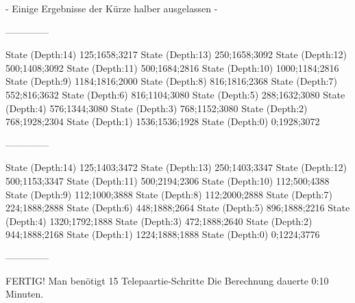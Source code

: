 \documentclass[a4paper,10pt,ngerman]{scrartcl}
\begin{document}
- Einige Ergebnisse der Kürze halber ausgelassen -






\begin{lstcs}
--------------

State (Depth:14) {125;1658;3217}
State (Depth:13) {250;1658;3092}
State (Depth:12) {500;1408;3092}
State (Depth:11) {500;1684;2816}
State (Depth:10) {1000;1184;2816}
State (Depth:9) {1184;1816;2000}
State (Depth:8) {816;1816;2368}
State (Depth:7) {552;816;3632}
State (Depth:6) {816;1104;3080}
State (Depth:5) {288;1632;3080}
State (Depth:4) {576;1344;3080}
State (Depth:3) {768;1152;3080}
State (Depth:2) {768;1928;2304}
State (Depth:1) {1536;1536;1928}
State (Depth:0) {0;1928;3072}

--------------

State (Depth:14) {125;1403;3472}
State (Depth:13) {250;1403;3347}
State (Depth:12) {500;1153;3347}
State (Depth:11) {500;2194;2306}
State (Depth:10) {112;500;4388}
State (Depth:9) {112;1000;3888}
State (Depth:8) {112;2000;2888}
State (Depth:7) {224;1888;2888}
State (Depth:6) {448;1888;2664}
State (Depth:5) {896;1888;2216}
State (Depth:4) {1320;1792;1888}
State (Depth:3) {472;1888;2640}
State (Depth:2) {944;1888;2168}
State (Depth:1) {1224;1888;1888}
State (Depth:0) {0;1224;3776}

--------------


FERTIG!
Man benötigt 15 Telepaartie-Schritte
Die Berechnung dauerte 0:10 Minuten.
\end{lstcs}
\end{document}
